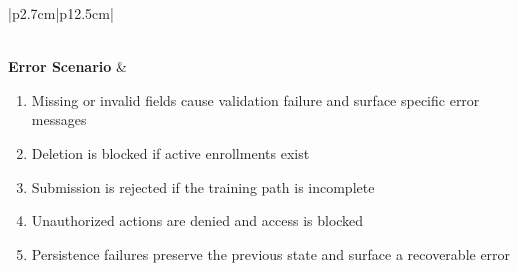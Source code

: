 \begin{table}[H]
\begin{tabular}{|p{2.7cm}|p{12.5cm}|}
\begin{minipage}[t]{\linewidth}
\begin{enumerate}[topsep=0pt,itemsep=1pt,parsep=0pt,partopsep=0pt]
            \end{enumerate}
        \end{minipage} \\
        \hline
        \textbf{Error Scenario} & \begin{minipage}[t]{\linewidth}
            \begin{enumerate}[topsep=0pt,itemsep=1pt,parsep=0pt,partopsep=0pt]
                \item Missing or invalid fields cause validation failure and surface specific error messages
                \item Deletion is blocked if active enrollments exist
                \item Submission is rejected if the training path is incomplete
                \item Unauthorized actions are denied and access is blocked
                \item Persistence failures preserve the previous state and surface a recoverable error
            \end{enumerate}
        \end{minipage} \\
        \hline
    \end{tabular}
    \label{tab:teacher-tp-lifecycle}
\end{table}
